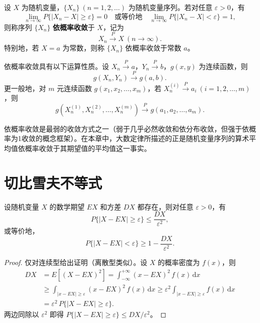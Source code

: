 \documentclass[lang=cn,11pt]{elegantbook}
\begin{document}
\begin{definition}[依概率收敛] \label{def:convergence-prob}
设 \(X\) 为随机变量，\(\{X_n\}\ (n=1,2,\dots)\) 为随机变量序列。若对任意 \(\varepsilon > 0\)，有
\[
\lim_{n\to\infty} P\{|X_n - X| \geqslant \varepsilon\} = 0
\quad \text{或等价地} \quad
\lim_{n\to\infty} P\{|X_n - X| < \varepsilon\} = 1,
\]
则称序列 \(\{X_n\}\) \textbf{依概率收敛}于 \(X\)，记为
\[
X_n \stackrel{P}{\longrightarrow} X\ (n\to\infty).
\]
特别地，若 \(X = a\) 为常数，则称 \(\{X_n\}\) 依概率收敛于常数 \(a\)。
\end{definition}

\begin{property}[概率收敛运算性质]\label{prop:conv-prob-operation}
依概率收敛具有以下运算性质。设 \(X_n \stackrel{P}{\longrightarrow} a\)，\(Y_n \stackrel{P}{\longrightarrow} b\)，\(g(x,y)\) 为连续函数，则
\[
g(X_n, Y_n) \stackrel{P}{\longrightarrow} g(a, b).
\]
更一般地，对 \(m\) 元连续函数 \(g(x_1, x_2, \dots, x_m)\)，若 \(X_{n}^{(i)} \stackrel{P}{\longrightarrow} a_i\ (i=1,2,\dots,m)\)，则
\[
g\!\left(X_{n}^{(1)}, X_{n}^{(2)}, \dots, X_{n}^{(m)}\right) \stackrel{P}{\longrightarrow} g(a_1, a_2, \dots, a_m).
\]
\end{property}

\begin{note}
依概率收敛是最弱的收敛方式之一（弱于几乎必然收敛和依分布收敛，但强于依概率为1收敛的概念框架）。在本章中，大数定律所描述的正是随机变量序列的算术平均值依概率收敛于其期望值的平均值这一事实。
\end{note}


\section{切比雪夫不等式}

\begin{theorem}[切比雪夫不等式] \label{thm:chebyshev}
设随机变量 \(X\) 的数学期望 \(EX\) 和方差 \(DX\) 都存在，则对任意 \(\varepsilon > 0\)，有
\[
P\{|X - EX| \geqslant \varepsilon\} \leqslant \frac{DX}{\varepsilon^2},
\]
或等价地，
\[
P\{|X - EX| < \varepsilon\} \geqslant 1 - \frac{DX}{\varepsilon^2}.
\]
\end{theorem}
\begin{proof}
仅对连续型给出证明（离散型类似）。设 \(X\) 的概率密度为 \(f(x)\)，则
\begin{align*}
DX &= E[(X-EX)^2] = \int_{-\infty}^{+\infty}(x-EX)^2\,f(x)\,\mathrm{d}x \\
&\geqslant \int_{|x-EX|\geqslant\varepsilon}(x-EX)^2\,f(x)\,\mathrm{d}x
\geqslant \varepsilon^2 \int_{|x-EX|\geqslant\varepsilon}f(x)\,\mathrm{d}x \\
&= \varepsilon^2\,P\{|X-EX| \geqslant \varepsilon\}.
\end{align*}
两边同除以 \(\varepsilon^2\) 即得 \(P\{|X-EX| \geqslant \varepsilon\} \leqslant DX/\varepsilon^2\)。
\end{proof}
\end{document}
